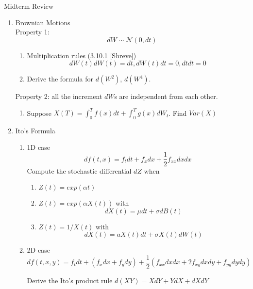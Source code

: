 \documentclass[12pt]{article}
\begin{document}
     
{\bf \centerline{\Large Midterm Review}}
\vskip0.5cm

\begin{enumerate}
\item Brownian Motions
\\
Property 1: 
\[
dW\sim\mathcal N(0,dt)
\]
\begin{enumerate}
\item Multiplication rules (3.10.1 [Shreve])
\[
dW(t)dW(t)=dt, dW(t)dt=0, dtdt=0
\]
\item Derive the formula for $d(W^2)$, $d(W^4)$.
\end{enumerate}
Property 2: all the increment $dW$s are independent from each other.
\begin{enumerate}
\item Suppose $X(T)=\int_0^T f(x)dt + \int_0^T g(x)dW_t$. Find $Var(X)$
\end{enumerate}
\newpage
\item Ito's Formula
\\
\begin{enumerate}
\item 1D case
\[
df(t,x) = f_tdt+f_xdx + \frac12 f_{xx}dxdx
\]
 Compute the stochastic differential $dZ$ when 
\begin{enumerate}
\item $Z(t) = exp(\alpha t)$
\item $Z(t) = exp(\alpha X(t))$ with 
\[
dX(t) = \mu dt + \sigma dB(t)
\]
\item
$Z(t)=1/X(t)$ with 
\[
dX(t) = aX(t)dt + \sigma X(t) dW(t)
\]
\end{enumerate}
\item 2D case
\[
df(t,x,y) = f_tdt+(f_xdx+f_ydy) + \frac12( f_{xx}dxdx+2f_{xy}dxdy+f_{yy}dydy )
\]

Derive the Ito's product rule $d(XY)=XdY+YdX+dXdY$


\end{enumerate}
\end{enumerate}
\end{document}
